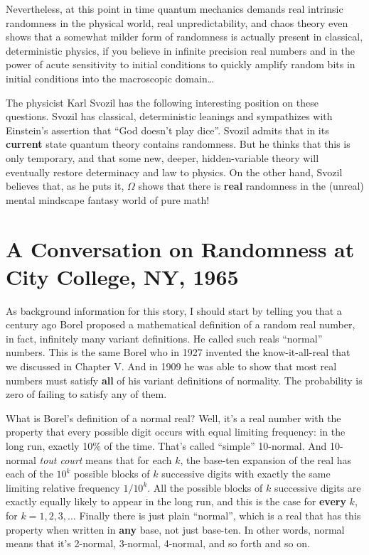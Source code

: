 \documentclass[12pt]{book}
\begin{document}
Nevertheless, at this point in time quantum mechanics demands real intrinsic randomness
in the physical world, real unpredictability, and chaos theory even shows that a somewhat
milder form of randomness is actually present in classical, deterministic physics, if you
believe in infinite precision real numbers and in the power of acute sensitivity to initial
conditions to quickly amplify random bits in initial conditions into the macroscopic domain\ldots 
 
The physicist Karl Svozil has the following interesting position on these
questions.  Svozil has classical, deterministic leanings 
and sympathizes with Einstein's assertion that
``God doesn't play dice''.  Svozil admits that in its 
\textbf{current} state quantum theory contains randomness.
But he thinks that this is only temporary, and that some new, deeper, hidden-variable theory will
eventually
restore determinacy and law to physics.  On the other hand, Svozil believes that, as he puts it,
$\Omega$ shows that
there is \textbf{real} randomness in the (unreal) mental mindscape fantasy world of pure math!

\section*{A Conversation on Randomness at City College, NY, 1965}

As background information for this story, I should start by telling
you that a century ago Borel proposed a
mathematical definition of a random real number, in fact, infinitely many variant definitions.
He called such reals ``normal'' numbers.
This is the same Borel who in 1927 invented the know-it-all-real that we discussed in Chapter V.
And in 1909 he was able to show that most real numbers must satisfy
\textbf{all} of his variant definitions of normality.
The probability is zero of failing to satisfy any of them.
 
What is Borel's definition of a normal real? Well, it's a real number with the property
that every possible digit occurs with equal limiting frequency: in the long run, exactly 10\%
of the time. That's called ``simple'' 10-normal.  
And 10-normal \emph{tout court} means that for each $k$, the base-ten
expansion of the real has each of the $10^k$ possible blocks of $k$ successive digits
with exactly the same limiting relative frequency $1/10^k$. All the possible blocks
of $k$ successive digits are exactly equally likely to appear in the long run, and this is the case for
\textbf{every} $k$, for $k = 1, 2, 3, \ldots$
Finally there is just plain ``normal'', which is a real that has this property when written
in \textbf{any} base, not just base-ten.
In other words, normal means that it's 2-normal, 3-normal, 4-normal, and so forth and so on.
 
\end{document}
